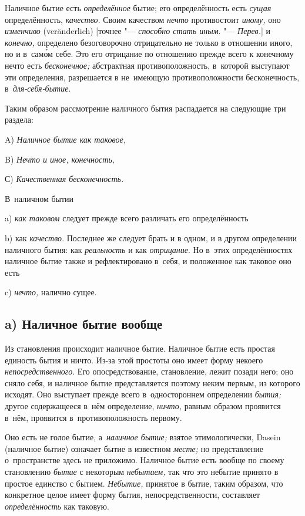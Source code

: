 Наличное бытие есть {\em определённое} бытие; его определённость есть
{\em сущая} определённость, {\em качество}. Своим качеством {\em нечто}
противостоит {\em иному,} оно {\em изменчиво} (ver\-änder\-lich)
[точнее "--- {\em способно стать иным}. "--- {\em Перев.}] и {\em конечно,}
определено безоговорочно отрицательно не только в отношении иного, но и
в~сам\'{о}м себе. Это его отрицание по отношению прежде всего к конечному нечто
есть {\em бесконечное;} абстрактная противоположность, в~которой выступают эти
определения, разрешается в не~имеющую противоположности бесконечность,
в~{\em для-себя-бытие}.

Таким образом рассмотрение наличного бытия
распадается на следующие три раздела:

A) {\em Наличное бытие как таковое,}

B) {\em Нечто и иное, конечность,}

С) {\em Качественная бесконечность.}


В~наличном бытии

a) {\em как таковом} следует прежде всего различать его определённость

b) как {\em качество}. Последнее же следует брать и в одном, и в другом
определении наличного бытия: как {\em реальность} и как {\em отрицание}.
Но в~этих определённостях наличное бытие также и рефлектировано в~себя,
и положенное как таковое оно есть

c) {\em нечто,} налично сущее.

\subsection[a) Наличное бытие вообще]{a) Наличное бытие вообще}

Из становления происходит наличное бытие. Наличное бытие есть простая единость
бытия и ничто. Из-за этой простоты оно имеет форму некоего
{\em непосредственного}. Его опосредствование, становление, лежит позади него;
оно сняло себя, и наличное бытие представляется поэтому неким первым, из
которого исходят. Оно выступает прежде всего в~одностороннем определении
{\em бытия;} другое содержащееся в~нём определение, {\em ничто,} равным
образом проявится в~нём, проявится в~противоположность первому.

Оно есть не голое бытие, а~{\em наличное бытие;} взятое этимологически, Dasein
(наличное бытие) означает бытие в известном {\em месте;} но представление
о~пространстве здесь не приложимо. Наличное бытие есть вообще по своему
становлению {\em бытие} с некоторым {\em небытием,} так что это небытие принято
в простое единство с бытием. {\em Небытие,} принятое в бытие, таким образом,
что конкретное целое имеет форму бытия, непосредственности, составляет
{\em определённость} как таковую.

